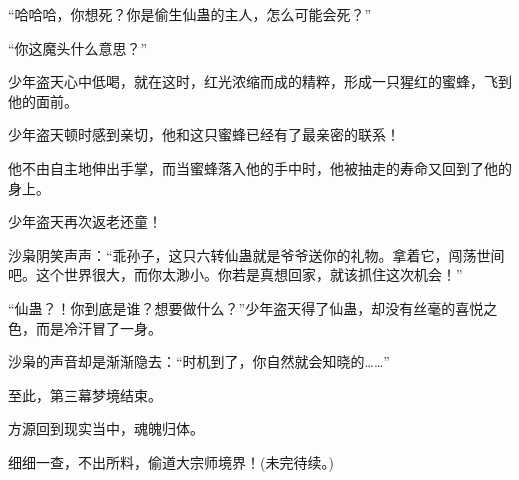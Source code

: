 \begin{this_body}
“哈哈哈，你想死？你是偷生仙蛊的主人，怎么可能会死？”

“你这魔头什么意思？”

少年盗天心中低喝，就在这时，红光浓缩而成的精粹，形成一只猩红的蜜蜂，飞到他的面前。

少年盗天顿时感到亲切，他和这只蜜蜂已经有了最亲密的联系！

他不由自主地伸出手掌，而当蜜蜂落入他的手中时，他被抽走的寿命又回到了他的身上。

少年盗天再次返老还童！

沙枭阴笑声声：“乖孙子，这只六转仙蛊就是爷爷送你的礼物。拿着它，闯荡世间吧。这个世界很大，而你太渺小。你若是真想回家，就该抓住这次机会！”

“仙蛊？！你到底是谁？想要做什么？”少年盗天得了仙蛊，却没有丝毫的喜悦之色，而是冷汗冒了一身。

沙枭的声音却是渐渐隐去：“时机到了，你自然就会知晓的……”

至此，第三幕梦境结束。

方源回到现实当中，魂魄归体。

细细一查，不出所料，偷道大宗师境界！(未完待续。)

\end{this_body}

